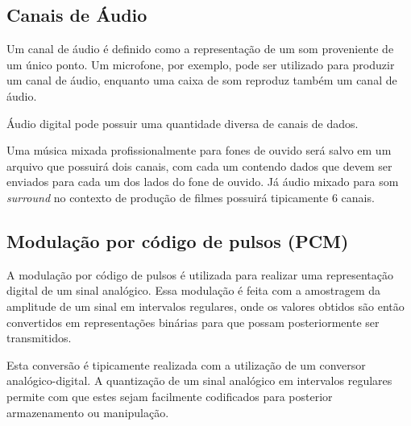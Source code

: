 \color{black}


\subsection{Canais de Áudio}
Um canal de áudio é definido como a representação de um som proveniente de um único ponto. Um microfone, por exemplo, pode ser utilizado para produzir um canal de áudio, enquanto uma caixa de som reproduz também um canal de áudio.

Áudio digital pode possuir uma quantidade diversa de canais de dados.

Uma música mixada profissionalmente para fones de ouvido será salvo em um arquivo que possuirá dois canais, com cada um contendo dados que devem ser enviados para cada um dos lados do fone de ouvido. Já áudio mixado para som \textit{surround} no contexto de produção de filmes possuirá tipicamente 6 canais.

\subsection{Modulação por código de pulsos (PCM)}
A modulação por código de pulsos é utilizada para realizar uma representação digital de um sinal analógico. Essa modulação é feita com a amostragem da amplitude de um sinal em intervalos regulares, onde os valores obtidos são então convertidos em representações binárias para que possam posteriormente ser transmitidos.

Esta conversão é tipicamente realizada com a utilização de um conversor analógico-digital. A quantização de um sinal analógico em intervalos regulares permite com que estes sejam facilmente codificados para posterior armazenamento ou manipulação.





